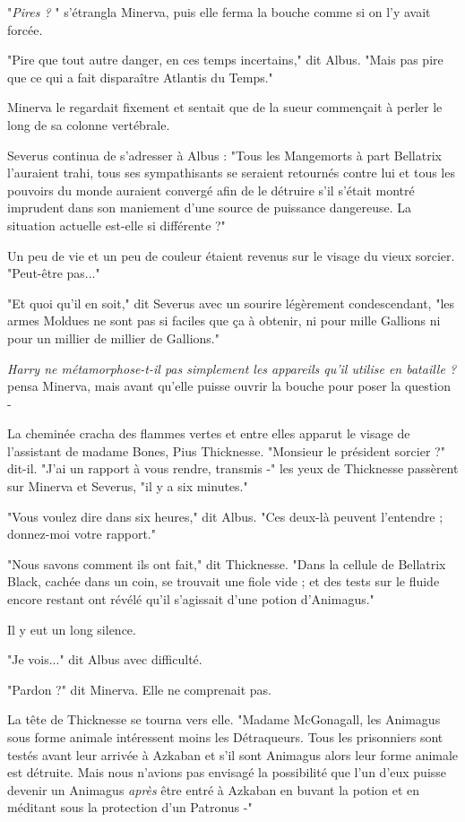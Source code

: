 "\emph{Pires ?} " s'étrangla Minerva, puis elle ferma la bouche comme si on l'y avait forcée.

"Pire que tout autre danger, en ces temps incertains," dit Albus. "Mais pas pire que ce qui a fait disparaître Atlantis du Temps."

Minerva le regardait fixement et sentait que de la sueur commençait à perler le long de sa colonne vertébrale.

Severus continua de s'adresser à Albus : "Tous les Mangemorts à part Bellatrix l'auraient trahi, tous ses sympathisants se seraient retournés contre lui et tous les pouvoirs du monde auraient convergé afin de le détruire s'il s'était montré imprudent dans son maniement d'une source de puissance dangereuse. La situation actuelle est-elle si différente ?"

Un peu de vie et un peu de couleur étaient revenus sur le visage du vieux sorcier. "Peut-être pas..."

"Et quoi qu'il en soit," dit Severus avec un sourire légèrement condescendant, "les armes Moldues ne sont pas si faciles que ça à obtenir, ni pour mille Gallions ni pour un millier de millier de Gallions."

\emph{Harry ne métamorphose-t-il pas simplement les appareils qu'il utilise en bataille ?}  pensa Minerva, mais avant qu'elle puisse ouvrir la bouche pour poser la question -

La cheminée cracha des flammes vertes et entre elles apparut le visage de l'assistant de madame Bones, Pius Thicknesse. "Monsieur le président sorcier ?" dit-il. "J'ai un rapport à vous rendre, transmis -" les yeux de Thicknesse passèrent sur Minerva et Severus, "il y a six minutes."

"Vous voulez dire dans six heures," dit Albus. "Ces deux-là peuvent l'entendre ; donnez-moi votre rapport."

"Nous savons comment ils ont fait," dit Thicknesse. "Dans la cellule de Bellatrix Black, cachée dans un coin, se trouvait une fiole vide ; et des tests sur le fluide encore restant ont révélé qu'il s'agissait d'une potion d'Animagus."

Il y eut un long silence.

"Je vois..." dit Albus avec difficulté.

"Pardon ?" dit Minerva. Elle ne comprenait pas.

La tête de Thicknesse se tourna vers elle. "Madame McGonagall, les Animagus sous forme animale intéressent moins les Détraqueurs. Tous les prisonniers sont testés avant leur arrivée à Azkaban et s'il sont Animagus alors leur forme animale est détruite. Mais nous n'avions pas envisagé la possibilité que l'un d'eux puisse devenir un Animagus \emph{après}  être entré à Azkaban en buvant la potion et en méditant sous la protection d'un Patronus -"

